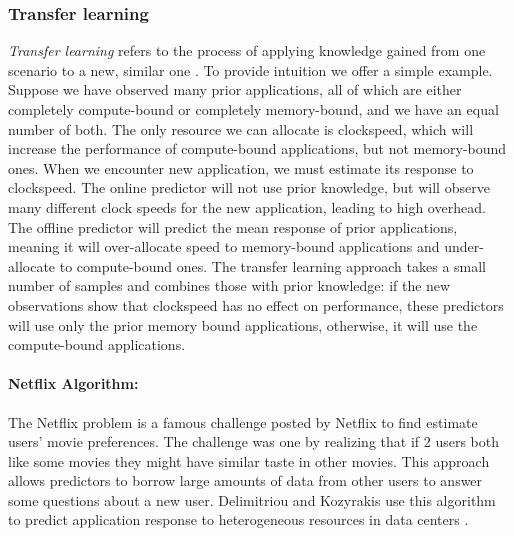 \subsubsection{Transfer learning}
\textit{Transfer learning} refers to the process of applying knowledge
gained from one scenario to a new, similar one \cite{pan2010survey}.
To provide intuition we offer a simple example.  Suppose we have
observed many prior applications, all of which are either completely
compute-bound or completely memory-bound, and we have an equal number
of both.  The only resource we can allocate is clockspeed, which will
increase the performance of compute-bound applications, but not
memory-bound ones.  When we encounter new application, we must
estimate its response to clockspeed.  The online predictor will not
use prior knowledge, but will observe many different clock speeds for
the new application, leading to high overhead.  The offline predictor
will predict the mean response of prior applications, meaning it will
over-allocate speed to memory-bound applications and under-allocate to
compute-bound ones.  The transfer learning approach takes a small
number of samples and combines those with prior knowledge: if the new
observations show that clockspeed has no effect on performance, these
predictors will use only the prior memory bound applications,
otherwise, it will use the compute-bound applications.

\paragraph{Netflix Algorithm:}
The Netflix problem is a famous challenge posted by Netflix to find
estimate users' movie preferences. The challenge was one by realizing
that if 2 users both like some movies they might have similar taste in
other movies. This approach allows predictors to borrow large amounts
of data from other users to answer some questions about a new user.
Delimitriou and Kozyrakis use this algorithm to predict application
response to heterogeneous resources in data centers
\cite{Paragon,quasar}.


